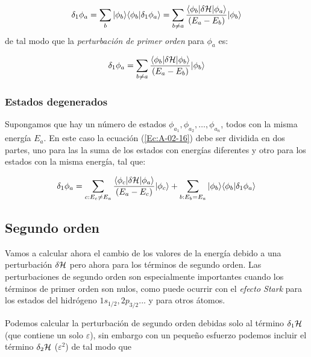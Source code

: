 \begin{equation}
    \delta_1 \phi_a = \sum_b |\phi_b \rangle \langle \phi_b | \delta_1 \phi_a \rangle = \sum_{b \neq a} \frac{\langle \phi_b |\delta \mathcal{H} |\phi_a \rangle}{(E_a-E_b)} |\phi_b \rangle \label{Ec:A-02-16}
\end{equation}
de tal modo que la \textit{perturbación de primer orden} para $\phi_a$ es:

\begin{equation}
    \delta_1 \phi_a = \sum_{b\neq a} \frac{\langle \phi_b |\delta \mathcal{H} |\phi_b \rangle}{(E_a - E_b)}|\phi_b \rangle
\end{equation}

\subsubsection{Estados degenerados}

Supongamos que hay un número de estados $\phi_{a_1}, \phi_{a_2},\ldots, \phi_{a_n}$, todos con la misma energía $E_a$.  En este caso la ecuación (\ref{Ec:A-02-16}) debe ser dividida en dos partes, uno para las la suma de los estados con energías diferentes y otro para los estados con la misma energía, tal que:

\begin{eqnarray}
	\delta_1 \phi_a = \sum_{c:E_c\neq E_a}\frac{\langle \phi_c | \delta \mathcal{H} | \phi_a \rangle}{(E_a-E_c)} |\phi_c\rangle + \sum_{b:E_b = E_a} |\phi_b \rangle \langle \phi_b | \delta_1 \phi_a \rangle
\end{eqnarray}


\subsection{Segundo orden} \label{Subsec:A-02-02}

Vamos a calcular ahora el cambio de los valores de la energía debido a una perturbación $\delta \mathcal{H}$ pero ahora para los términos de segundo orden. Las perturbaciones de segundo orden son especialmente importantes cuando los términos de primer orden son nulos, como puede ocurrir con el \textit{efecto Stark} para los estados del hidrógeno $1s_{1/2},2p_{3/2}$... y para otros átomos. 

Podemos calcular la perturbación de segundo orden debidas solo al término $\delta_1 \mathcal{H}$ (que contiene un solo $\varepsilon$), sin embargo con un pequeño esfuerzo podemos incluir el término $\delta_2 \mathcal{H}$ ($\varepsilon^2$) de tal modo que

